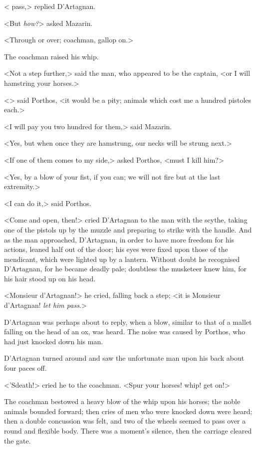 < pass,> replied D'Artagnan.

<But \emph{how?}> asked Mazarin.

<Through or over; coachman, gallop on.>

The coachman raised his whip.

<Not a step further,> said the man, who appeared to be the captain, <or I will hamstring your horses.>

<> said Porthos, <it would be a pity; animals which cost me a hundred pistoles each.>

<I will pay you two hundred for them,> said Mazarin.

<Yes, but when once they are hamstrung, our necks will be strung next.>

<If one of them comes to my side,> asked Porthos, <must I kill him?>

<Yes, by a blow of your fist, if you can; we will not fire but at the last extremity.>

<I can do it,> said Porthos.

<Come and open, then!> cried D'Artagnan to the man with the scythe, taking one of the pistols up by the muzzle and preparing to strike with the handle. And as the man approached, D'Artagnan, in order to have more freedom for his actions, leaned half out of the door; his eyes were fixed upon those of the mendicant, which were lighted up by a lantern. Without doubt he recognised D'Artagnan, for he became deadly pale; doubtless the musketeer knew him, for his hair stood up on his head.

<Monsieur d'Artagnan!> he cried, falling back a step; <it is Monsieur d'Artagnan! \emph{let him pass}.>

D'Artagnan was perhaps about to reply, when a blow, similar to that of a mallet falling on the head of an ox, was heard. The noise was caused by Porthos, who had just knocked down his man.

D'Artagnan turned around and saw the unfortunate man upon his back about four paces off.

<'Sdeath!> cried he to the coachman. <Spur your horses! whip! get on!>

The coachman bestowed a heavy blow of the whip upon his horses; the noble animals bounded forward; then cries of men who were knocked down were heard; then a double concussion was felt, and two of the wheels seemed to pass over a round and flexible body. There was a moment's silence, then the carriage cleared the gate.

